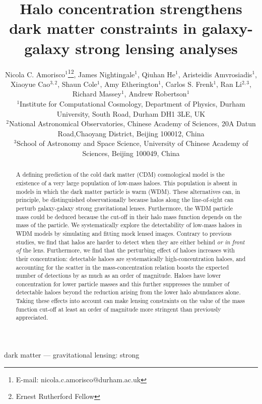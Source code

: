 \documentclass[a4paper, fleqn, usenatbib, useAMS]{mnras}
\title[Halo detectability in warm dark matter models]{Halo concentration strengthens dark matter constraints in galaxy-galaxy strong lensing analyses}
\author[N. C. Amorisco et al.]{Nicola C. Amorisco$^{1}$\thanks{E-mail:
nicola.c.amorisco@durham.ac.uk}\thanks{Ernest Rutherford Fellow},  James Nightingale$^{1}$, Qiuhan He$^{1}$, \newauthor
Aristeidis Amvrosiadis$^{1}$, 
 Xiaoyue Cao$^{3,2}$,
Shaun Cole$^{1}$, Amy Etherington$^{1}$, \newauthor
Carlos S. Frenk$^{1}$, Ran Li$^{2,3}$, Richard Massey$^{1}$, 
 Andrew Robertson$^{1}$ 
\\
$^{1}$Institute for Computational Cosmology, Department of Physics, Durham University, South Road, Durham DH1 3LE, UK\\
$^{2}$National Astronomical Observatories, Chinese Academy of Sciences, 20A Datun Road,Chaoyang District, Beijing 100012, China \\
$^{3}$School of Astronomy and Space Science, University of Chinese Academy of Sciences, Beijing 100049, China\\}
\begin{document}
%


\pagerange{\pageref{firstpage}--\pageref{lastpage}} 

\maketitle

\label{firstpage}

\begin{abstract}

 \noindent A defining prediction of the cold dark matter (CDM) cosmological
  model is the existence of a very large population of low-mass
  haloes. This population is absent in models in which the dark matter
  particle is warm (WDM).  These alternatives can, in principle, be
  distinguished observationally because halos along the line-of-sight
  can perturb galaxy-galaxy strong gravitational lenses. Furthermore,
  the WDM particle mass could be deduced because the cut-off in their
  halo mass function depends on the mass of the particle. We
  systematically explore the detectability of low-mass haloes in WDM
  models by simulating and fitting mock lensed images.  Contrary to
  previous studies, we find that halos are harder to detect when they
  are either behind {\it or in front of} the
  lens. Furthermore, we find that the perturbing effect of haloes
  increases with their concentration: detectable haloes are
  systematically high-concentration haloes, and accounting for the
  scatter in the mass-concentration relation boosts the expected
  number of detections by as much as an order of magnitude. Haloes
  have lower concentration for lower particle masses and this further
  suppresses the number of detectable haloes beyond the reduction
  arising from the lower halo abundances alone. Taking these effects
  into account can make lensing constraints on the value of the mass
  function cut-off at least an order of magnitude more stringent than
  previously appreciated.


\end{abstract}

\begin{keywords}
dark matter --- gravitational lensing: strong\end{keywords}

\end{document}
